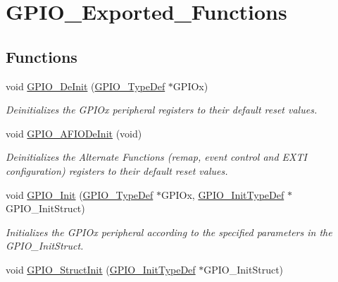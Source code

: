 \hypertarget{group___g_p_i_o___exported___functions}{}\section{G\+P\+I\+O\+\_\+\+Exported\+\_\+\+Functions}
\label{group___g_p_i_o___exported___functions}
\subsection*{Functions}
\begin{DoxyCompactItemize}
\item 
void \mbox{\hyperlink{group___g_p_i_o___exported___functions_gaa60bdf3182c44b5fa818f237042f52ee}{G\+P\+I\+O\+\_\+\+De\+Init}} (\mbox{\hyperlink{struct_g_p_i_o___type_def}{G\+P\+I\+O\+\_\+\+Type\+Def}} $\ast$G\+P\+I\+Ox)
\begin{DoxyCompactList}\small\item\em Deinitializes the G\+P\+I\+Ox peripheral registers to their default reset values. \end{DoxyCompactList}\item 
void \mbox{\hyperlink{group___g_p_i_o___exported___functions_ga7f645e6b6146818c3d6c19021e70170c}{G\+P\+I\+O\+\_\+\+A\+F\+I\+O\+De\+Init}} (void)
\begin{DoxyCompactList}\small\item\em Deinitializes the Alternate Functions (remap, event control and E\+X\+TI configuration) registers to their default reset values. \end{DoxyCompactList}\item 
void \mbox{\hyperlink{group___g_p_i_o___exported___functions_ga71abf9404261370d03cca449b88d3a65}{G\+P\+I\+O\+\_\+\+Init}} (\mbox{\hyperlink{struct_g_p_i_o___type_def}{G\+P\+I\+O\+\_\+\+Type\+Def}} $\ast$G\+P\+I\+Ox, \mbox{\hyperlink{struct_g_p_i_o___init_type_def}{G\+P\+I\+O\+\_\+\+Init\+Type\+Def}} $\ast$G\+P\+I\+O\+\_\+\+Init\+Struct)
\begin{DoxyCompactList}\small\item\em Initializes the G\+P\+I\+Ox peripheral according to the specified parameters in the G\+P\+I\+O\+\_\+\+Init\+Struct. \end{DoxyCompactList}\item 
void \mbox{\hyperlink{group___g_p_i_o___exported___functions_gab28de41278e7f8c63d0851e2733b10df}{G\+P\+I\+O\+\_\+\+Struct\+Init}} (\mbox{\hyperlink{struct_g_p_i_o___init_type_def}{G\+P\+I\+O\+\_\+\+Init\+Type\+Def}} $\ast$G\+P\+I\+O\+\_\+\+Init\+Struct)

\end{DoxyCompactItemize}
